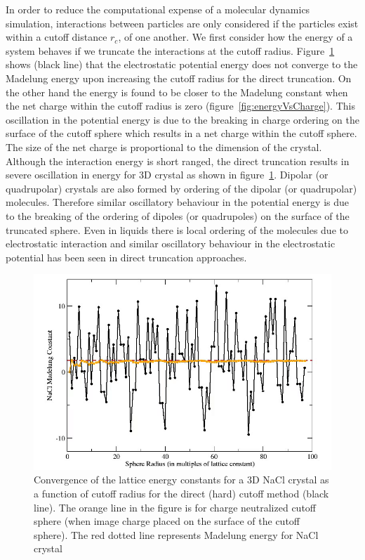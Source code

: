 In order to reduce the computational expense of a molecular dynamics simulation, interactions between particles are only considered if the particles exist within a cutoff distance $r_c$, of one another. We first consider how the energy of a system behaves if we truncate the interactions at the cutoff radius.  Figure~\ref{fig:energyVsCutoff} shows (black line) that the electrostatic potential energy does not converge to the Madelung energy upon increasing the cutoff radius for the direct truncation. On the other hand the energy is found to be closer to the Madelung constant when the net charge within the cutoff radius is zero (figure~\ref{fig:energyVsCharge}). This oscillation in the potential energy is due to the breaking in charge ordering on the surface of the cutoff sphere which results in a net charge within the cutoff sphere. The size of the net charge is proportional to the dimension of the crystal. Although the interaction energy is short ranged,  the direct truncation results in severe oscillation in energy for 3D crystal as shown in figure~\ref{fig:energyVsCutoff}. Dipolar (or quadrupolar) crystals are also formed by ordering of the dipolar (or quadrupolar) molecules. Therefore similar oscillatory behaviour in the potential energy is due to the breaking of the ordering of dipoles (or quadrupoles) on the surface of the truncated sphere. Even in liquids there is local ordering of the molecules due to electrostatic interaction and similar oscillatory behaviour in the electrostatic potential has been seen in direct truncation approaches.

\begin{figure}[tpb]
  \begin{center}
    \centerline{\includegraphics[width = \linewidth]{energyVsCutoff.png}}
    \caption{Convergence of the lattice energy constants for a 3D NaCl crystal as a function of cutoff radius for the direct (hard) cutoff method (black line). The orange line in the figure is for charge neutralized cutoff sphere (when image charge placed on the surface of the cutoff sphere). The red dotted line represents Madelung energy for NaCl crystal}
    \label{fig:energyVsCutoff}
  \end{center}
\end{figure}

